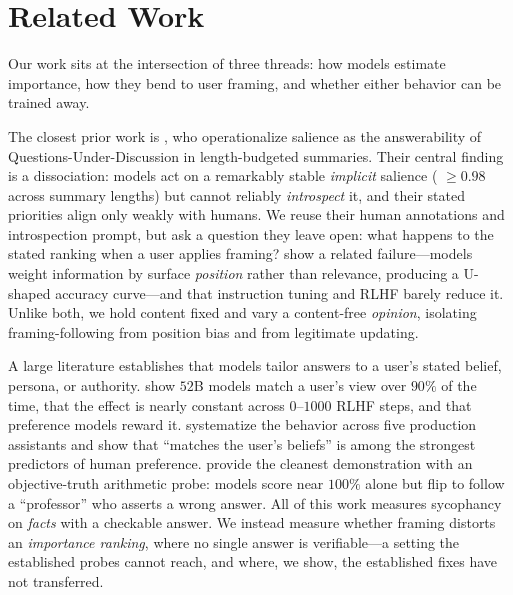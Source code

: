 \section{Related Work}
\label{sec:related}

Our work sits at the intersection of three threads: how models estimate importance, how
they bend to user framing, and whether either behavior can be trained away.

 The closest prior work is
\citet{trienes2025salience}, who operationalize salience as the answerability of
Questions-Under-Discussion in length-budgeted summaries. Their central finding is a
dissociation: models act on a remarkably stable \emph{implicit} salience (\rhospear{}
$\geq 0.98$ across summary lengths) but cannot reliably \emph{introspect} it, and their
stated priorities align only weakly with humans. We reuse their human annotations and
introspection prompt, but ask a question they leave open: what happens to the stated
ranking when a user applies framing? \citet{liu2023lost} show a related failure---models
weight information by surface \emph{position} rather than relevance, producing a U-shaped
accuracy curve---and that instruction tuning and RLHF barely reduce it. Unlike both, we
hold content fixed and vary a content-free \emph{opinion}, isolating framing-following from
position bias and from legitimate updating.

 A large literature establishes that models tailor
answers to a user's stated belief, persona, or authority.
\citet{perez2022discovering} show $52$B models match a user's view over $90\%$ of the time,
that the effect is nearly constant across $0$--$1000$ RLHF steps, and that preference models
reward it. \citet{sharma2024sycophancy} systematize the behavior across five production
assistants and show that ``matches the user's beliefs'' is among the strongest predictors of
human preference. \citet{wei2023simple} provide the cleanest demonstration with an
objective-truth arithmetic probe: models score near $100\%$ alone but flip to follow a
``professor'' who asserts a wrong answer. All of this work measures sycophancy on
\emph{facts} with a checkable answer. We instead measure whether framing distorts an
\emph{importance ranking}, where no single answer is verifiable---a setting the established
probes cannot reach, and where, we show, the established fixes have not transferred.

